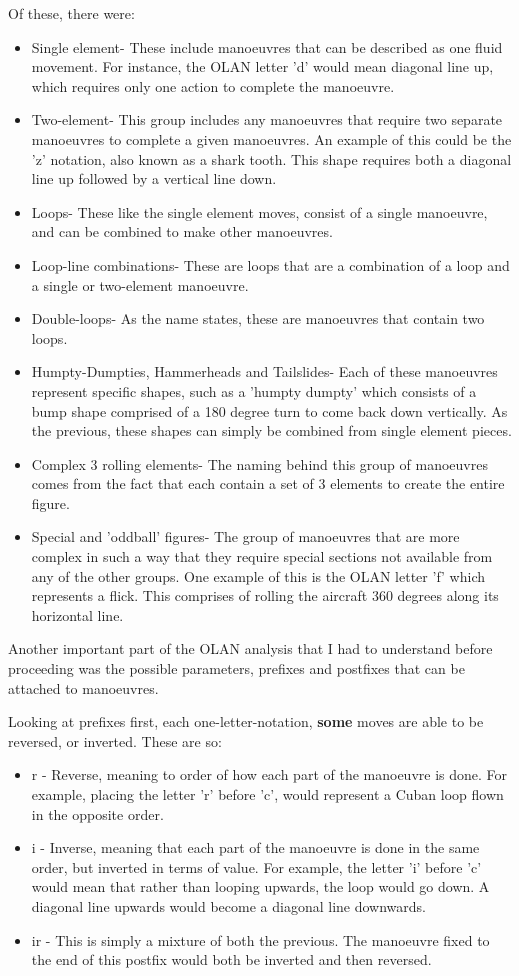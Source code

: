 Of these, there were:
\begin{itemize}
	\item Single element- These include manoeuvres that can be described as one fluid movement. For instance, the OLAN letter 'd' would mean diagonal line up, which requires only one action to complete the manoeuvre.
	\item Two-element- This group includes any manoeuvres that require two separate manoeuvres to complete a given manoeuvres. An example of this could be the 'z' notation, also known as a shark tooth. This shape requires both a diagonal line up followed by a vertical line down. 
	\item Loops- These like the single element moves, consist of a single manoeuvre, and can be combined to make other manoeuvres.
	\item Loop-line combinations- These are loops that are a combination of a loop and a single or two-element manoeuvre.
	\item Double-loops- As the name states, these are manoeuvres that contain two loops.
	\item Humpty-Dumpties, Hammerheads and Tailslides- Each of these manoeuvres represent specific shapes, such as a 'humpty dumpty' which consists of a bump shape comprised of a 180 degree turn to come back down vertically. As the previous, these shapes can simply be combined from single element pieces. 
	\item Complex 3 rolling elements- The naming behind this group of manoeuvres comes from the fact that each contain a set of 3 elements to create the entire figure.
	\item Special and 'oddball' figures- The group of manoeuvres that are more complex in such a way that they require special sections not available from any of the other groups. One example of this is the OLAN letter 'f' which represents a flick. This comprises of rolling the aircraft 360 degrees along its horizontal line.
\end{itemize}

Another important part of the OLAN analysis that I had to understand before proceeding was the possible parameters, prefixes and postfixes that can be attached to manoeuvres. 

Looking at prefixes first, each one-letter-notation, \textbf{some} moves are able to be reversed, or inverted. These are so:
\begin{itemize}
	\item r - Reverse, meaning to order of how each part of the manoeuvre is done. For example, placing the letter 'r' before 'c', would represent a Cuban loop flown in the opposite order. 
	\item i - Inverse, meaning that each part of the manoeuvre is done in the same order, but inverted in terms of value. For example, the letter 'i' before 'c' would mean that rather than looping upwards, the loop would go down. A diagonal line upwards would become a diagonal line downwards.
	\item ir - This is simply a mixture of both the previous. The manoeuvre fixed to the end of this postfix would both be inverted and then reversed. 
\end{itemize}

